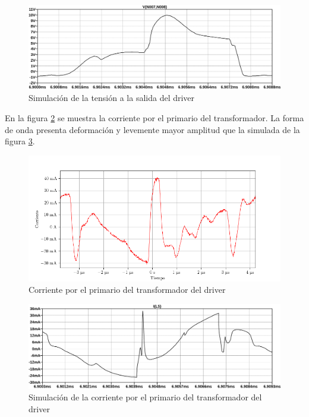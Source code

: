 \begin{figure}[H]
    \centering
    \includegraphics[width=\textwidth]{images/sim/15.pdf}
    \caption{Simulación de la tensión a la salida del driver}
    \label{fig:sim:driver_vout_connected}
\end{figure}

En la figura \ref{fig:osc:11} se muestra la corriente por el primario del transformador. La forma de onda presenta deformación y levemente mayor amplitud que la simulada de la figura \ref{fig:sim:6}.

\begin{figure}[H]
    \centering
    \includegraphics[width=\textwidth]{images/capturas-osciloscopio/17-11-2022/11.png}
    \caption{Corriente por el primario del transformador del driver}
    \label{fig:osc:11}
\end{figure}

\begin{figure}[H]
    \centering
    \includegraphics[width=\textwidth]{images/sim/6.pdf}
    \caption{Simulación de la corriente por el primario del transformador del driver}
    \label{fig:sim:6}
\end{figure}

